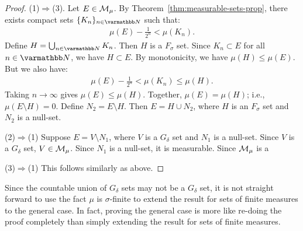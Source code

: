 \begin{proof}
            (1)$\Rightarrow$(3). Let $E \in \mathcal{M}_\mu$. By Theorem~\ref{thm:measurable-sets-prop}, there exists compact sets $\{K_n\}_{n \in \bfN}$ such that:
                \begin{equation*}
                \begin{split}
                    \mu(E) - \frac{1}{2^n} < \mu(K_n).
                \end{split}
                \end{equation*}
            Define $H = \bigcup_{n \in \bfN}K_n$. Then $H$ is a $F_\sigma$ set. Since $K_n \subset E$ for all $n \in \bfN$, we have $H \subset E$. By monotonicity, we have $\mu(H) \leq \mu(E)$. But we also have:
                \begin{equation*}
                \begin{split}
                    \mu(E) - \frac{1}{2^n} < \mu(K_n) \leq \mu(H).
                \end{split}
                \end{equation*}
            Taking $n\rightarrow \infty$ gives $\mu(E) \leq \mu(H)$. Together, $\mu(E) = \mu(H)$; i.e., $\mu(E \setminus H) = 0$. Define $N_2 = E \setminus H$. Then $E = H \cup N_2$, where $H$ is an $F_\sigma$ set and $N_2$ is a null-set.

            (2)$\Rightarrow$(1) Suppose $E = V \setminus N_1$, where $V$ is a $G_\delta$ set and $N_1$ is a null-set. Since $V$ is a $G_\delta$ set, $V \in \mathcal{M}_\mu$. Since $N_1$ is a null-set, it is measurable. Since $\mathcal{M}_\mu$ is a 

            (3)$\Rightarrow$(1) This follows similarly as above.
        \end{proof}
    
    Since the countable union of $G_\delta$ sets may not be a $G_\delta$ set, it is not straight forward to use the fact $\mu$ is $\sigma$-finite to extend the result for sets of finite measures to the general case. In fact, proving the general case is more like re-doing the proof completely than simply extending the result for sets of finite measures.

